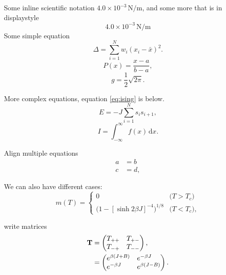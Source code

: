 \documentclass[
    10pt,aps,prl,
    amsfonts,
    amssymb,
    amsmath,
    draft,
    runinaddress,
    secnum,
    showkeys,
    superscriptaddress,
    twocolumn,
]{revtex4}
\begin{document}
Some inline scientific notation $4.0\times 10^{-3}\,\mathrm{N/m}$\cite{NISTsp811},
    and some more that is in displaystyle
\begin{equation}
    4.0\times 10^{-3}\,\mathrm{N/m}
\end{equation}
Some simple equation
\begin{equation}
    \Delta =\sum_{i=1}^N w_i (x_i - \bar{x})^2.
\end{equation}
\begin{equation}
    P(x) = \frac{x - a}{b - a}, \nonumber
\end{equation}
\begin{equation}
    g = \frac{1}{2} \sqrt{2\pi}. \nonumber
\end{equation}

More complex equations, equation \ref{eq:ising} is below.
\begin{equation}
    \label{eq:ising}
    E = -J \sum_{i=1}^N s_i s_{i+1},
\end{equation}
\begin{equation}
    I = \! \int_{-\infty}^\infty f(x)\,\mathrm{d}x \label{eq:fine}.
\end{equation}

Align multiple equations
\begin{align}
    a & = b \\
    c &= d,
\end{align}

We can also have different cases:
\begin{equation}
\label{eq:mdiv}
m(T) =
\begin{cases}
0 & \text{($T > T_c$)} \\
\big(1 - [\sinh 2 \beta J]^{-4} \big)^{\! 1/8} & \text{($T < T_c$)},
\end{cases}
\end{equation}

write matrices
\begin{align}
\textbf{T} &=
\begin{pmatrix}
T_{++} \hfill & T_{+-} \\
T_{-+} & T_{--} \hfill 
\end{pmatrix}, \nonumber \\
& =
\begin{pmatrix}
e^{\beta (J + B)} \hfill & e^{-\beta J} \hfill \\
e^{-\beta J} \hfill & e^{\beta (J - B)} \hfill
\end{pmatrix}.
\end{align}
\end{document}
